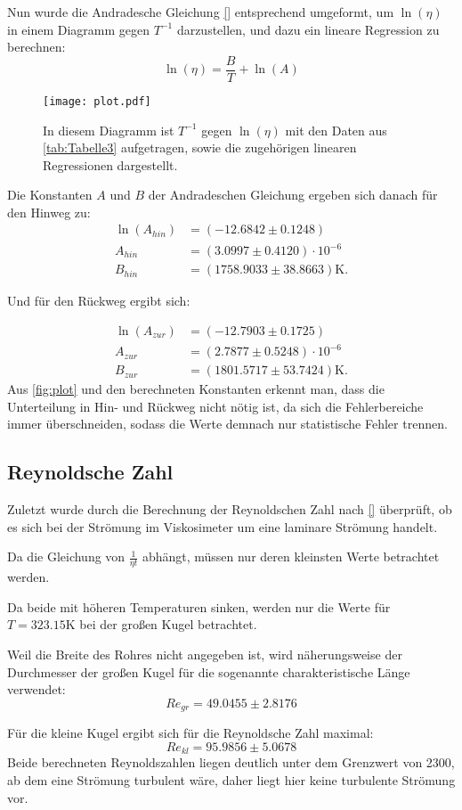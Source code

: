 Nun wurde die Andradesche Gleichung \eqref{} entsprechend umgeformt,
 um $\ln\left(\eta\right)$ in einem Diagramm gegen $T^{-1}$ darzustellen, und dazu ein lineare Regression zu berechnen:
\begin{equation*}
  \ln\left(\eta\right) = \frac{B}{T} + \ln\left(A\right)
\end{equation*}
\begin{figure}[H]
  \centering
  \texttt{[image: plot.pdf]}
  \caption{In diesem Diagramm ist $T^{-1}$ gegen $\ln\left(\eta\right)$ mit den Daten aus \autoref{tab:Tabelle3} aufgetragen, 
  sowie die zugehörigen linearen Regressionen dargestellt.}
  \label{fig:plot}
\end{figure}

Die Konstanten $A$ und $B$ der Andradeschen Gleichung ergeben sich danach für den Hinweg zu:
\begin{align*}
  \ln\left(A_{hin}\right) &= (-12.6842\pm 0.1248) \\
  A_{hin} &= (3.0997\pm 0.4120 ) \cdot 10^{-6} \\
  B_{hin} &= (1758.9033\pm 38.8663)\unit{\kelvin}.
\end{align*}

Und für den Rückweg ergibt sich:

\begin{align*}
  \ln\left(A_{zur}\right) &= (-12.7903\pm 0.1725) \\
  A_{zur} &= (2.7877\pm 0.5248 ) \cdot 10^{-6} \\
  B_{zur} &= (1801.5717\pm 53.7424)\unit{\kelvin}.
\end{align*}
Aus \autoref{fig:plot} und den berechneten Konstanten erkennt man, dass die Unterteilung in Hin- und Rückweg nicht nötig ist, da sich die Fehlerbereiche
immer überschneiden, sodass die Werte demnach nur statistische Fehler trennen.

\subsection{Reynoldsche Zahl}

Zuletzt wurde durch die Berechnung der Reynoldschen Zahl nach \eqref{} überprüft, ob es sich bei der
Strömung im Viskosimeter um eine laminare Strömung handelt. 

Da die Gleichung von $\frac{1}{\eta t}$ abhängt,
müssen nur deren kleinsten Werte betrachtet werden.

Da beide mit höheren Temperaturen sinken, werden nur die Werte für
$T = 323.15\unit{\kelvin}$ bei der großen Kugel betrachtet. 

Weil die Breite des Rohres nicht angegeben ist, wird näherungsweise
der Durchmesser der großen Kugel für die sogenannte charakteristische Länge verwendet:
\begin{equation*}
  Re_{gr} = 49.0455\pm 2.8176
\end{equation*}

Für die kleine Kugel ergibt sich für die Reynoldsche Zahl maximal:
\begin{equation*}
  Re_{kl} = 95.9856\pm 5.0678
\end{equation*}
Beide berechneten Reynoldszahlen liegen deutlich unter dem Grenzwert von 2300, ab dem eine Strömung turbulent wäre, daher liegt hier
keine turbulente Strömung vor.